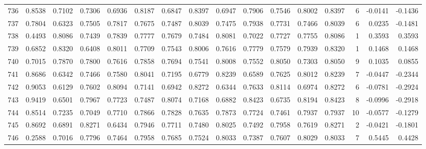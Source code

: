 \begin{tabular}{lrrrrrrrrrrrrrrr}
736 &      0.8538 &  0.7102 &  0.7306 &  0.6936 &  0.8187 &  0.6847 &  0.8397 &  0.6947 &  0.7906 &  0.7546 &   0.8002 &     0.8397 &      6 &                   -0.0141 &                    -0.1436 \\
737 &      0.7804 &  0.6323 &  0.7505 &  0.7817 &  0.7675 &  0.7487 &  0.8039 &  0.7475 &  0.7938 &  0.7731 &   0.7466 &     0.8039 &      6 &                    0.0235 &                    -0.1481 \\
738 &      0.4493 &  0.8086 &  0.7439 &  0.7839 &  0.7777 &  0.7679 &  0.7484 &  0.8081 &  0.7022 &  0.7727 &   0.7755 &     0.8086 &      1 &                    0.3593 &                     0.3593 \\
739 &      0.6852 &  0.8320 &  0.6408 &  0.8011 &  0.7709 &  0.7543 &  0.8006 &  0.7616 &  0.7779 &  0.7579 &   0.7939 &     0.8320 &      1 &                    0.1468 &                     0.1468 \\
740 &      0.7015 &  0.7870 &  0.7800 &  0.7616 &  0.7858 &  0.7694 &  0.7541 &  0.8008 &  0.7552 &  0.8050 &   0.7303 &     0.8050 &      9 &                    0.1035 &                     0.0855 \\
741 &      0.8686 &  0.6342 &  0.7466 &  0.7580 &  0.8041 &  0.7195 &  0.6779 &  0.8239 &  0.6589 &  0.7625 &   0.8012 &     0.8239 &      7 &                   -0.0447 &                    -0.2344 \\
742 &      0.9053 &  0.6129 &  0.7602 &  0.8094 &  0.7141 &  0.6942 &  0.8272 &  0.6344 &  0.7633 &  0.8114 &   0.6974 &     0.8272 &      6 &                   -0.0781 &                    -0.2924 \\
743 &      0.9419 &  0.6501 &  0.7967 &  0.7723 &  0.7487 &  0.8074 &  0.7168 &  0.6882 &  0.8423 &  0.6735 &   0.8194 &     0.8423 &      8 &                   -0.0996 &                    -0.2918 \\
744 &      0.8514 &  0.7235 &  0.7049 &  0.7710 &  0.7866 &  0.7828 &  0.7635 &  0.7873 &  0.7724 &  0.7461 &   0.7937 &     0.7937 &     10 &                   -0.0577 &                    -0.1279 \\
745 &      0.8692 &  0.6891 &  0.8271 &  0.6434 &  0.7946 &  0.7711 &  0.7480 &  0.8025 &  0.7492 &  0.7958 &   0.7619 &     0.8271 &      2 &                   -0.0421 &                    -0.1801 \\
746 &      0.2588 &  0.7016 &  0.7796 &  0.7464 &  0.7958 &  0.7685 &  0.7524 &  0.8033 &  0.7387 &  0.7607 &   0.8029 &     0.8033 &      7 &                    0.5445 &                     0.4428 \\

\end{tabular}
